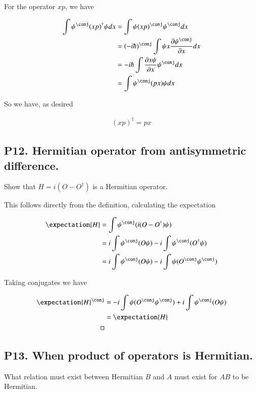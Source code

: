 \documentclass{article}
\begin{document}
For the operator $xp$, we have

\begin{align*}
\int \psi^\conj (xp)^\dagger \psi dx 
&= \int \psi (xp)^\conj \psi^\conj dx \\
&= (-i\hbar)^\conj \int \psi x \PD{x}{\psi^\conj} dx \\
&= - i\hbar \int \PD{x}{x \psi} \psi^\conj dx \\
&= \int \psi^\conj (p x) \psi dx \\
\end{align*}

So we have, as desired

\begin{align*}
(xp)^\dagger = p x
\end{align*}

\subsection{P12. Hermitian operator from antisymmetric difference. }

Show that $H = i (O - O^\dagger)$ is a Hermitian operator.

This follows directly from the definition, calculating the expectation

\begin{align*}
\expectation{H} 
&=\int \psi^\conj (i (O - O^\dagger) \psi ) \\
&=
i \int \psi^\conj (O \psi )
-i \int \psi^\conj (O^\dagger \psi ) \\
&=
i \int \psi^\conj (O \psi )
-i \int \psi (O^\conj \psi^\conj) \\
\end{align*}

Taking conjugates we have

\begin{align*}
\expectation{H}^\conj
&=
-i \int \psi (O^\conj \psi^\conj )
+i \int \psi^\conj (O \psi ) \\
&=
\expectation{H} \\
\quad\quad\quad \square
\end{align*}


\subsection{P13. When product of operators is Hermitian. }

What relation must exist between Hermitian $B$ and $A$ must exist for $AB$ to be Hermitian.
\end{document}
